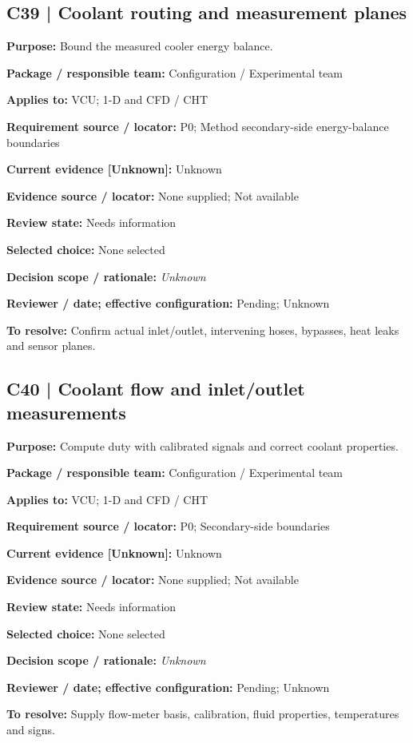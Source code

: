 \documentclass[11pt]{article}
\begin{document}
\begin{minipage}{\textwidth}\small\setlength{\parskip}{2pt}
\subsection*{C39 | Coolant routing and measurement planes}
\textbf{Purpose:} Bound the measured cooler energy balance.\par
\textbf{Package / responsible team:} Configuration / Experimental team\par
\textbf{Applies to:} VCU; 1-D and CFD / CHT\par
\textbf{Requirement source / locator:} P0; Method secondary-side energy-balance boundaries\par
\textbf{Current evidence [Unknown]:} Unknown\par
\textbf{Evidence source / locator:} None supplied; Not available\par
\textbf{Review state:} Needs information\par
\textbf{Selected choice:} None selected\par
\textbf{Decision scope / rationale:} \textit{Unknown}\par
\textbf{Reviewer / date; effective configuration:} Pending; Unknown\par
\textbf{To resolve:} Confirm actual inlet/outlet, intervening hoses, bypasses, heat leaks and sensor planes.\par
\end{minipage}\par\vspace{5pt}
\begin{minipage}{\textwidth}\small\setlength{\parskip}{2pt}
\subsection*{C40 | Coolant flow and inlet/outlet measurements}
\textbf{Purpose:} Compute duty with calibrated signals and correct coolant properties.\par
\textbf{Package / responsible team:} Configuration / Experimental team\par
\textbf{Applies to:} VCU; 1-D and CFD / CHT\par
\textbf{Requirement source / locator:} P0; Secondary-side boundaries\par
\textbf{Current evidence [Unknown]:} Unknown\par
\textbf{Evidence source / locator:} None supplied; Not available\par
\textbf{Review state:} Needs information\par
\textbf{Selected choice:} None selected\par
\textbf{Decision scope / rationale:} \textit{Unknown}\par
\textbf{Reviewer / date; effective configuration:} Pending; Unknown\par
\textbf{To resolve:} Supply flow-meter basis, calibration, fluid properties, temperatures and signs.\par
\end{minipage}\par\vspace{5pt}
\end{document}
